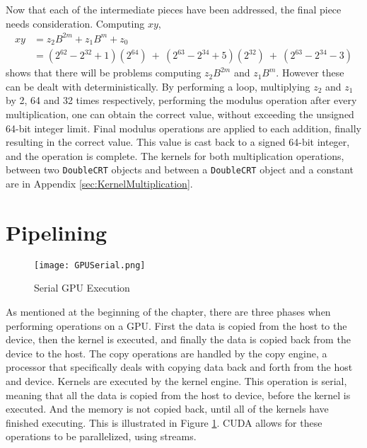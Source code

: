 Now that each of the intermediate pieces have been addressed, the final piece needs consideration. Computing $xy$,
\begin{equation}
\begin{split}
xy & = z_2 B^{2m} + z_1 B^{m} + z_0\\
 & = (2^{62} - 2^{32} + 1) (2^{64})\ +\ (2^{63} - 2^{34} + 5) (2^{32})\ +\ (2^{63} - 2^{34} - 3)
\end{split}
\end{equation}
shows that there will be problems computing $z_2 B^{2m}$ and $z_1 B^{m}$. However these can be dealt with deterministically. By performing a loop, multiplying $z_2$ and $z_1$ by 2, 64 and 32 times respectively, performing the modulus operation after every multiplication, one can obtain the correct value, without exceeding the unsigned 64-bit integer limit. Final modulus operations are applied to each addition, finally resulting in the correct value. This value is cast back to a signed 64-bit integer, and the operation is complete. The kernels for both multiplication operations, between two \verb|DoubleCRT| objects and between a \verb|DoubleCRT| object and a constant are in Appendix \ref{sec:KernelMultiplication}.

\section{Pipelining} \label{sec:Pipelining}
\begin{figure}[htp]
\centering
\texttt{[image: GPUSerial.png]}
\caption{Serial GPU Execution}
\label{fig:GPUSerial}
\end{figure}
As mentioned at the beginning of the chapter, there are three phases when performing operations on a GPU. First the data is copied from the host to the device, then the kernel is executed, and finally the data is copied back from the device to the host. The copy operations are handled by the copy engine, a processor that specifically deals with copying data back and forth from the host and device. Kernels are executed by the kernel engine. This operation is serial, meaning that all the data is copied from the host to device, before the kernel is executed. And the memory is not copied back, until all of the kernels have finished executing. This is illustrated in Figure \ref{fig:GPUSerial}. CUDA allows for these operations to be parallelized, using streams.

